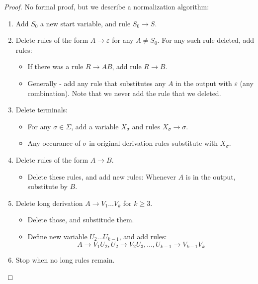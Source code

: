\begin{proof}
	No formal proof, but we describe a normalization algorithm:
	\begin{mythrm}
		[Translation ($\Gg$)]\begin{enumerate}
			\item Add $S_0$ a new start variable, and rule $S_0\to S$.
			\item Delete rules of the form $A\to \varepsilon$ for any $A\neq S_0$. For any such rule deleted, add rules:
			\begin{itemize}
				\item If there was a rule $R\to AB$, add rule $R\to B$. 
				\item Generally - add any rule that substitutes any $A$ in the output with $\varepsilon$ (any combination). Note that we never add the rule that we deleted.
			\end{itemize}
			\item Delete terminals:
			\begin{itemize}
				\item For any $\sigma\in \Sigma$, add a variable $X_\sigma$ and rules $X_\sigma\to \sigma$.
				\item Any occurance of $\sigma$ in original derivation rules substitute with $X_\sigma$.
			\end{itemize}
			\item Delete rules of the form $A\to B$. 
			\begin{itemize}
				\item Delete these rules, and add new rules: Whenever $A$ is in the output, substitute by $B$.
			\end{itemize}
			\item Delete long derivation $A\to V_1\ldots V_k$ for $k \geq 3$.
			\begin{itemize}
				\item Delete those, and substitude them.
				\item Define new variable $U_2\ldots U_{k-1}$, and add rules:
				\[
				A\to V_1U_2, U_2\to V_2U_3, \ldots ,U_{k-1} \to V_{k-1}V_k
				\]
				
			\end{itemize}
		\item Stop when no long rules remain.
		\end{enumerate}
	\end{mythrm}
\end{proof}
